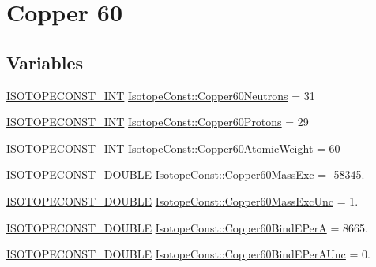 \hypertarget{group___isotope_const-_copper-_cu60}{}\section{Copper 60}
\label{group___isotope_const-_copper-_cu60}
\subsection*{Variables}
\begin{DoxyCompactItemize}
\item 
\mbox{\hyperlink{group___isotope_const-_macros_ga5f18360b3e99483a35c32d789e62621c}{I\+S\+O\+T\+O\+P\+E\+C\+O\+N\+S\+T\+\_\+\+I\+NT}} \mbox{\hyperlink{group___isotope_const-_copper-_cu60_ga87ccc7e776854b82cb9d3b2d7dbd3684}{Isotope\+Const\+::\+Copper60\+Neutrons}} = 31
\item 
\mbox{\hyperlink{group___isotope_const-_macros_ga5f18360b3e99483a35c32d789e62621c}{I\+S\+O\+T\+O\+P\+E\+C\+O\+N\+S\+T\+\_\+\+I\+NT}} \mbox{\hyperlink{group___isotope_const-_copper-_cu60_ga18f6753a6515964b8d42d9d5a4ef36ed}{Isotope\+Const\+::\+Copper60\+Protons}} = 29
\item 
\mbox{\hyperlink{group___isotope_const-_macros_ga5f18360b3e99483a35c32d789e62621c}{I\+S\+O\+T\+O\+P\+E\+C\+O\+N\+S\+T\+\_\+\+I\+NT}} \mbox{\hyperlink{group___isotope_const-_copper-_cu60_ga394ad9dcf8b55547928ec60d518473c4}{Isotope\+Const\+::\+Copper60\+Atomic\+Weight}} = 60
\item 
\mbox{\hyperlink{group___isotope_const-_macros_ga8f45a7272ce02c0b4c65c44636ed719a}{I\+S\+O\+T\+O\+P\+E\+C\+O\+N\+S\+T\+\_\+\+D\+O\+U\+B\+LE}} \mbox{\hyperlink{group___isotope_const-_copper-_cu60_ga50ad1b7e1fafcb71d4ce623929ac6334}{Isotope\+Const\+::\+Copper60\+Mass\+Exc}} = -\/58345.
\item 
\mbox{\hyperlink{group___isotope_const-_macros_ga8f45a7272ce02c0b4c65c44636ed719a}{I\+S\+O\+T\+O\+P\+E\+C\+O\+N\+S\+T\+\_\+\+D\+O\+U\+B\+LE}} \mbox{\hyperlink{group___isotope_const-_copper-_cu60_ga055658339e248611335e0f5e39673414}{Isotope\+Const\+::\+Copper60\+Mass\+Exc\+Unc}} = 1.
\item 
\mbox{\hyperlink{group___isotope_const-_macros_ga8f45a7272ce02c0b4c65c44636ed719a}{I\+S\+O\+T\+O\+P\+E\+C\+O\+N\+S\+T\+\_\+\+D\+O\+U\+B\+LE}} \mbox{\hyperlink{group___isotope_const-_copper-_cu60_ga9e7f8c7e57c4f4911e5aa2245f0717ba}{Isotope\+Const\+::\+Copper60\+Bind\+E\+PerA}} = 8665.
\item 
\mbox{\hyperlink{group___isotope_const-_macros_ga8f45a7272ce02c0b4c65c44636ed719a}{I\+S\+O\+T\+O\+P\+E\+C\+O\+N\+S\+T\+\_\+\+D\+O\+U\+B\+LE}} \mbox{\hyperlink{group___isotope_const-_copper-_cu60_ga16ab0c679c4c4ee64b7a3448dedade4b}{Isotope\+Const\+::\+Copper60\+Bind\+E\+Per\+A\+Unc}} = 0.

\end{DoxyCompactItemize}
